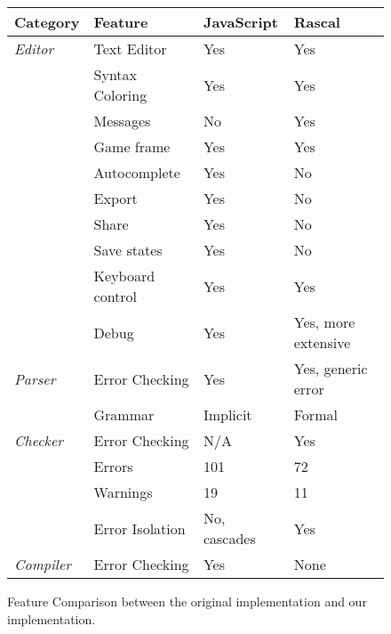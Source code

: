 \begin{figure}[!t]
    \centering
    \caption{Feature Comparison between the original implementation and our implementation.}
\begin{tabular}{l|l|l|l}
    \textbf{Category} & \textbf{Feature}           & \textbf{JavaScript} & \textbf{Rascal}       \\ \hline
    \textit{Editor}   & Text Editor       & Yes                       & Yes                         \\
             & Syntax Coloring   & Yes                       & Yes                         \\
             & Messages          & No                        & Yes                         \\
             & Game frame        & Yes                       & Yes                         \\
             & Autocomplete      & Yes                       & No                         \\
             & Export            & Yes                       & No                          \\
             & Share             & Yes                       & No                          \\
             & Save states       & Yes                       & No                          \\
             & Keyboard control  & Yes                       & Yes                         \\
             & Debug             & Yes                       & Yes, more extensive         \\
    \textit{Parser}   & Error Checking    & Yes                       & Yes, generic error          \\
             & Grammar           & Implicit                  & Formal                      \\
    \textit{Checker}  & Error Checking    & N/A                       & Yes                         \\
             & Errors            & 101                       & 72                          \\
             & Warnings          & 19                        & 11                          \\
             & Error Isolation   & No, cascades              & Yes                         \\
    \textit{Compiler} & Error Checking    & Yes                       & None                        \\

\end{tabular}
\end{figure}
